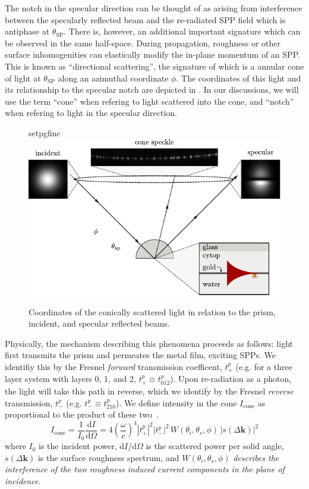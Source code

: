 The notch in the specular direction can be thought of as arising from 
interference between the specularly reflected beam and the
re-radiated SPP field which is antiphase at $\theta_\mathrm{SP}$.  There
is, however, an additional important signature which can be observed in the
same half-space.  During propagation, roughness or other surface
inhomogenities can elastically modify the in-plane momentum of an SPP.
This is known as ``directional scattering'', the signature of which is a
annular cone of light at $\theta_\mathrm{SP}$ along an azimuthal coordinate
$\phi$.  The coordinates of this light and its relationship to the specular
notch are depicted in .  In our 
discussions, we will use the term ``cone'' when refering to light scattered
into the cone, and ``notch'' when refering to light in the specular
direction.
\begin{figure}[ht]
 \centering
 {setpgfinc}
 \includegraphics{existence/figures/conefig}
 \caption{Coordinates of the conically scattered light in relation to the
 prism, incident, and specular reflected beams.}
 \label{fig:conefig}
\end{figure}

Physically, the mechanism describing this phenomena proceeds as follows:
light first transmits the prism and permeates the metal film, exciting
SPPs.  We identifiy this by the Fresnel \textit{forward}
transmission coefficent, $t^p_+$ (e.g. for a three layer system with layers
0, 1, and 2, $t^p_+ \equiv t^p_{012}$).  Upon re-radiation as a photon, the
light will take this path in reverse, which we identify by the Fresnel
\textit{reverse} transmission, $t^p_-$ (e.g. $t^p_- \equiv t^p_{210}$).  We
define intensity in the cone $I_\mathrm{cone}$ as proportional to the
product of these two~\cite{simon1976directional}.
\begin{equation}
I_\mathrm{cone} 
= \frac{1}{I_0}\frac{\mathrm{d}I}{\mathrm{d}\Omega} 
= 4 \left(\frac{\omega}{c}\right)^4 |t^p_+|^2
|t^p_-|^2\,W(\theta_i,\theta_s,\phi)\, |s(\Delta \mathbf{k})|^2
\label{eqn:guhacone}
\end{equation}
where $I_0$ is the incident power, $\mathrm{d}I/\mathrm{d}\Omega$ is the
scattered power per solid angle, $s(\Delta \mathbf{k})$ is the surface
roughness spectrum, and $W(\theta_i,\theta_s,\phi)$ \textit{describes the
								interference of the two roughness induced current components in the
plane of incidence}.


